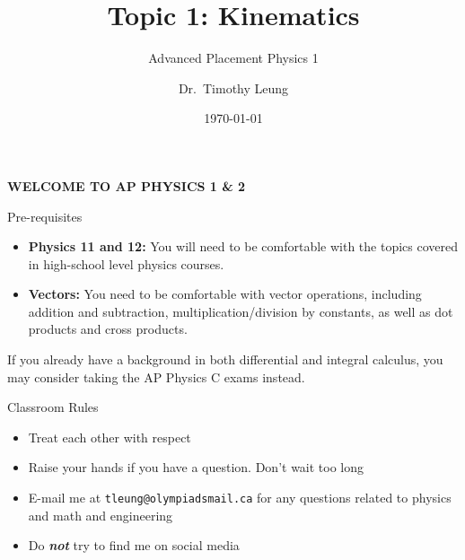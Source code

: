 \documentclass[12pt,compress,aspectratio=169]{beamer}
\title{Topic 1: Kinematics}
\subtitle{Advanced Placement Physics 1}
\author[TML]{Dr.\ Timothy Leung}
\institute{Olympiads School}
\date{\today}
\begin{document}
\begin{frame}{}

  {\LARGE
    \begin{center}
      \textbf{WELCOME TO AP PHYSICS 1 \& 2}
    \end{center}
  }
\end{frame}



\begin{frame}{Pre-requisites}
  \begin{itemize}
  \item\textbf{Physics 11 and 12:} You will need to be comfortable with the
    topics covered in high-school level physics courses.
  \item\textbf{Vectors:} You need to be comfortable with vector operations,
    including addition and subtraction, multiplication/division by constants,
    as well as dot products and cross products.
  \end{itemize}
  If you already have a background in both differential and integral calculus,
  you may consider taking the AP Physics C exams instead.
\end{frame}






\begin{frame}{Classroom Rules}
  \begin{itemize}
  \item Treat each other with respect
  \item Raise your hands if you have a question. Don't wait too long
  \item E-mail me at \texttt{tleung@olympiadsmail.ca} for any questions related
    to physics and math and engineering
  \item Do \textbf{\emph{not}} try to find me on social media
  \end{itemize}
\end{frame}
\end{document}
